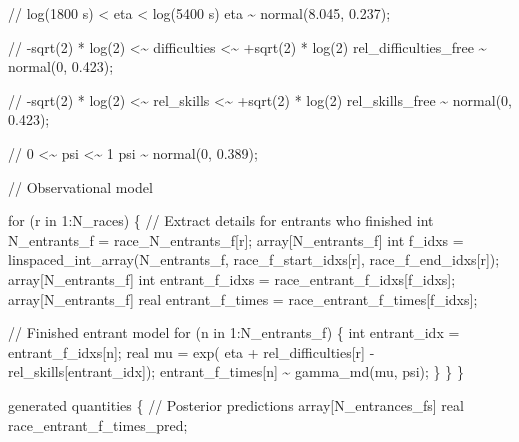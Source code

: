 \documentclass[
  letterpaper,
  DIV=11,
  numbers=noendperiod]{scrartcl}
\newenvironment{Shaded}{\begin{snugshade}}{\end{snugshade}}
\newcommand{\CommentTok}[1]{\textcolor[rgb]{0.37,0.37,0.37}{#1}}
\newcommand{\ControlFlowTok}[1]{\textcolor[rgb]{0.00,0.23,0.31}{#1}}
\newcommand{\DataTypeTok}[1]{\textcolor[rgb]{0.68,0.00,0.00}{#1}}
\newcommand{\DecValTok}[1]{\textcolor[rgb]{0.68,0.00,0.00}{#1}}
\newcommand{\FloatTok}[1]{\textcolor[rgb]{0.68,0.00,0.00}{#1}}
\newcommand{\KeywordTok}[1]{\textcolor[rgb]{0.00,0.23,0.31}{#1}}
\newcommand{\NormalTok}[1]{\textcolor[rgb]{0.00,0.23,0.31}{#1}}
\begin{document}
\begin{codelisting}
\begin{Shaded}
\begin{Highlighting}[]
  \CommentTok{// log(1800 s) \textless{} eta \textless{} log(5400 s)}
\NormalTok{  eta \textasciitilde{} normal(}\FloatTok{8.045}\NormalTok{, }\FloatTok{0.237}\NormalTok{);}

  \CommentTok{// {-}sqrt(2) * log(2) \textless{}\textasciitilde{} difficulties \textless{}\textasciitilde{} +sqrt(2) * log(2)}
\NormalTok{  rel\_difficulties\_free \textasciitilde{} normal(}\DecValTok{0}\NormalTok{, }\FloatTok{0.423}\NormalTok{);}

  \CommentTok{// {-}sqrt(2) * log(2) \textless{}\textasciitilde{} rel\_skills \textless{}\textasciitilde{} +sqrt(2) * log(2)}
\NormalTok{  rel\_skills\_free \textasciitilde{} normal(}\DecValTok{0}\NormalTok{, }\FloatTok{0.423}\NormalTok{);}

  \CommentTok{// 0 \textless{}\textasciitilde{} psi \textless{}\textasciitilde{} 1}
\NormalTok{  psi \textasciitilde{} normal(}\DecValTok{0}\NormalTok{, }\FloatTok{0.389}\NormalTok{);}

  \CommentTok{// Observational model}

  \ControlFlowTok{for}\NormalTok{ (r }\ControlFlowTok{in} \DecValTok{1}\NormalTok{:N\_races) \{}
    \CommentTok{// Extract details for entrants who finished}
    \DataTypeTok{int}\NormalTok{ N\_entrants\_f = race\_N\_entrants\_f[r];}
    \DataTypeTok{array}\NormalTok{[N\_entrants\_f] }\DataTypeTok{int}\NormalTok{ f\_idxs}
\NormalTok{      = linspaced\_int\_array(N\_entrants\_f,}
\NormalTok{                            race\_f\_start\_idxs[r],}
\NormalTok{                            race\_f\_end\_idxs[r]);}
    \DataTypeTok{array}\NormalTok{[N\_entrants\_f] }\DataTypeTok{int}\NormalTok{ entrant\_f\_idxs}
\NormalTok{      = race\_entrant\_f\_idxs[f\_idxs];}
    \DataTypeTok{array}\NormalTok{[N\_entrants\_f] }\DataTypeTok{real}\NormalTok{ entrant\_f\_times}
\NormalTok{      = race\_entrant\_f\_times[f\_idxs];}

    \CommentTok{// Finished entrant model}
    \ControlFlowTok{for}\NormalTok{ (n }\ControlFlowTok{in} \DecValTok{1}\NormalTok{:N\_entrants\_f) \{}
      \DataTypeTok{int}\NormalTok{ entrant\_idx = entrant\_f\_idxs[n];}
      \DataTypeTok{real}\NormalTok{ mu = exp(  eta}
\NormalTok{                    + rel\_difficulties[r]}
\NormalTok{                    {-} rel\_skills[entrant\_idx]);}
\NormalTok{      entrant\_f\_times[n] \textasciitilde{} gamma\_md(mu, psi);}
\NormalTok{    \}}
\NormalTok{  \}}
\NormalTok{\}}

\KeywordTok{generated quantities}\NormalTok{ \{}
  \CommentTok{// Posterior predictions}
  \DataTypeTok{array}\NormalTok{[N\_entrances\_fs] }\DataTypeTok{real}\NormalTok{ race\_entrant\_f\_times\_pred;}


\end{Highlighting}
\end{Shaded}
\end{codelisting}
\end{document}
